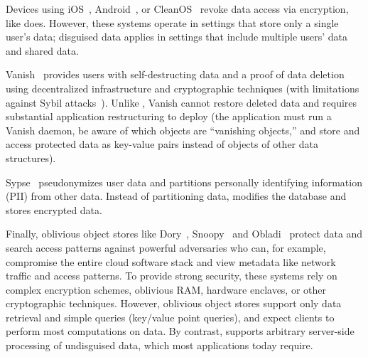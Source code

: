 %
Devices using iOS~\cite{applesecurity}, Android~\cite{applesecurity}, or
CleanOS~\cite{cleanos} revoke data access via encryption, like \sys does.
%
However, these systems operate in settings that store only a single user's data;
disguised data applies in settings that include multiple users' data and shared
data.
%

%
Vanish~\cite{vanish} provides users with self-destructing data and a proof of
data deletion using decentralized infrastructure and cryptographic techniques
(with limitations against Sybil attacks~\cite{defeat_vanish}). Unlike \sys,
Vanish cannot restore deleted data and requires substantial application
restructuring to deploy (\eg the application must run a Vanish daemon, be aware of which
objects are ``vanishing objects,'' and store and access protected data
as key-value pairs instead of objects of other data structures).
%

%
Sypse~\cite{sypse} pseudonymizes user data and partitions personally identifying
information (PII) from other data. Instead of partitioning data, \sys modifies
the database and stores encrypted \xxed data.
%

%
Finally, oblivious object stores like Dory~\cite{dory}, Snoopy~\cite{snoopy} and
Obladi~\cite{obladi} protect data and search access patterns against powerful
adversaries who can, for example, compromise the entire cloud software stack and
view metadata like network traffic and access patterns. To provide strong
security, these systems rely on complex encryption schemes, oblivious RAM,
hardware enclaves, or other cryptographic techniques.
%
However, oblivious object stores support only data retrieval and simple queries
(\eg key/value point queries), and expect clients to perform most 
computations on data.
%
By contrast, \sys supports arbitrary server-side processing of undisguised
data, which most applications today require. 
%


%
%
%

